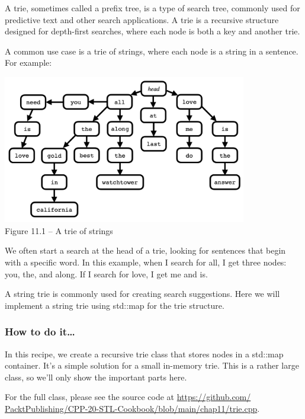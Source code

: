 
A trie, sometimes called a prefix tree, is a type of search tree, commonly used for predictive text and other search applications. A trie is a recursive structure designed for depth-first searches, where each node is both a key and another trie.

A common use case is a trie of strings, where each node is a string in a sentence. For example:

\begin{center}
\includegraphics[width=0.8\textwidth]{content/chapter11/images/1.png}\\
Figure 11.1 – A trie of strings
\end{center}

We often start a search at the head of a trie, looking for sentences that begin with a specific word. In this example, when I search for all, I get three nodes: you, the, and along.
If I search for love, I get me and is.

A string trie is commonly used for creating search suggestions. Here we will implement a string trie using std::map for the trie structure.

\subsubsection{How to do it…}

In this recipe, we create a recursive trie class that stores nodes in a std::map container. It's a simple solution for a small in-memory trie. This is a rather large class, so we'll only show the important parts here.

For the full class, please see the source code at \url{https://github.com/ PacktPublishing/CPP-20-STL-Cookbook/blob/main/chap11/trie.cpp}.

